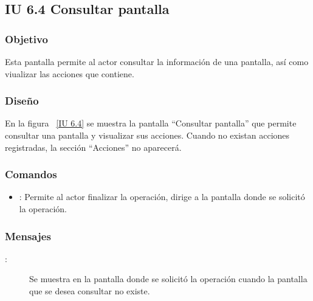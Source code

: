\newpage 
\subsection{IU 6.4 Consultar pantalla}

\subsubsection{Objetivo}
	
	Esta pantalla permite al actor consultar la información de una pantalla, así como viualizar las acciones que contiene.

\subsubsection{Diseño}

    En la figura ~\ref{IU 6.4} se muestra la pantalla ``Consultar pantalla'' que permite consultar una pantalla y visualizar sus acciones. Cuando no existan acciones registradas, la sección ``Acciones'' no aparecerá. \\



\subsubsection{Comandos}
\begin{itemize}
	\item {}: Permite al actor finalizar la operación, dirige a la pantalla donde se solicitó la operación.
\end{itemize}

\subsubsection{Mensajes}
	
\begin{description}
	\item[:] Se muestra en la pantalla donde se solicitó la operación cuando la pantalla que se desea consultar no existe.
\end{description}
